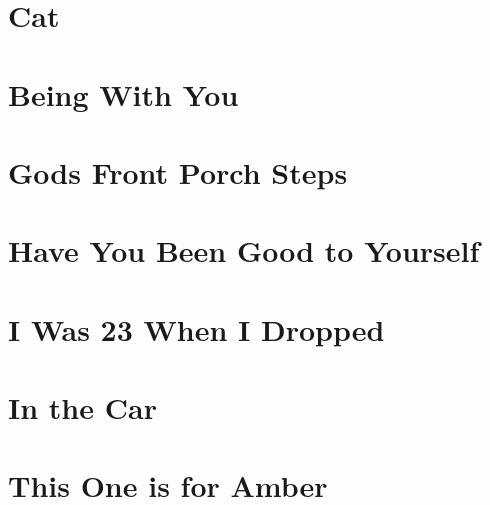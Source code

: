 \chapter{Cat}


\chapter{Being With You}


\chapter{Gods Front Porch Steps}


\chapter{Have You Been Good to Yourself}


\chapter{I Was 23 When I Dropped}


\chapter{In the Car}


\chapter{This One is for Amber}











